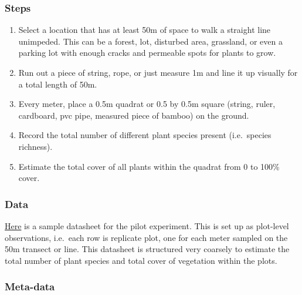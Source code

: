 \documentclass[
]{book}
\providecommand{\tightlist}{%
  \setlength{\itemsep}{0pt}\setlength{\parskip}{0pt}}
\begin{document}
\hypertarget{steps-2}{%
\subsubsection*{Steps}\label{steps-2}}

\begin{enumerate}
\def\labelenumi{\arabic{enumi}.}
\tightlist
\item
  Select a location that has at least 50m of space to walk a straight line unimpeded. This can be a forest, lot, disturbed area, grassland, or even a parking lot with enough cracks and permeable spots for plants to grow.\\
\item
  Run out a piece of string, rope, or just measure 1m and line it up visually for a total length of 50m.\\
\item
  Every meter, place a 0.5m quadrat or 0.5 by 0.5m square (string, ruler, cardboard, pvc pipe, measured piece of bamboo) on the ground.\\
\item
  Record the total number of different plant species present (i.e.~species richness).\\
\item
  Estimate the total cover of all plants within the quadrat from 0 to 100\% cover.
\end{enumerate}

\hypertarget{data-2}{%
\subsubsection*{Data}\label{data-2}}

\href{https://figshare.com/articles/dataset/BIOL3250_survey_datasheet/12792482}{Here} is a sample datasheet for the pilot experiment. This is set up as plot-level observations, i.e.~each row is replicate plot, one for each meter sampled on the 50m transect or line. This datasheet is structured very coarsely to estimate the total number of plant species and total cover of vegetation within the plots.

\hypertarget{meta-data-2}{%
\subsubsection*{Meta-data}\label{meta-data-2}}
\end{document}
